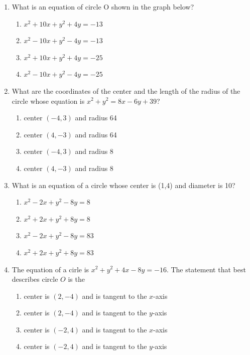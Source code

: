 \documentclass[12pt, oneside]{article}
\begin{document}
\begin{enumerate}[itemsep=0cm]
\item What is an equation of circle O shown in the graph below?
  \begin{center}
  \end{center}
  \begin{multicols}{2}
    \begin{enumerate}
      \item $x^2+10x+y^2+4y=-13$
      \item $x^2-10x+y^2-4y=-13$
      \item $x^2+10x+y^2+4y=-25$
      \item $x^2-10x+y^2-4y=-25$
    \end{enumerate}
  \end{multicols}

\newpage
\item What are the coordinates of the center and the length of the radius of the circle whose equation is $x^2+y^2=8x-6y+39$?
    \begin{enumerate}
      \item center $(-4,3)$ and radius 64
      \item center $(4,-3)$ and radius 64
      \item center $(-4,3)$ and radius 8
      \item center $(4,-3)$ and radius 8
    \end{enumerate}

\item What is an equation of a circle whose center is (1,4) and diameter is 10?
  \begin{enumerate}
    \item $x^2-2x+y^2-8y=8$
    \item $x^2+2x+y^2+8y=8$
    \item $x^2-2x+y^2-8y=83$
    \item $x^2+2x+y^2+8y=83$
  \end{enumerate}    
     
\item The equation of a cirle is $x^2+y^2+4x-8y=-16$. The statement that best describes circle $O$ is the
    \begin{enumerate}
      \item center is $(2,-4)$ and is tangent to the $x$-axis
      \item center is $(2,-4)$ and is tangent to the $y$-axis
      \item center is $(-2,4)$ and is tangent to the $x$-axis
      \item center is $(-2,4)$ and is tangent to the $y$-axis
    \end{enumerate}


\end{enumerate}
\end{document}
